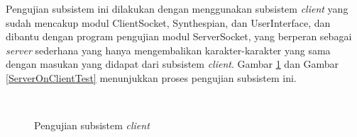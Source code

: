 Pengujian subsistem ini dilakukan dengan menggunakan subsistem \textit{client} yang sudah mencakup modul ClientSocket, Synthespian, dan UserInterface,
dan dibantu dengan program pengujian modul ServerSocket,
yang berperan sebagai \textit{server} sederhana yang hanya mengembalikan karakter-karakter yang sama dengan masukan yang didapat dari subsistem \textit{client}.
Gambar \ref{ClientOnClientTest} dan Gambar \ref{ServerOnClientTest} menunjukkan proses pengujian subsistem ini.

\begin{figure}
\centering
{}
\\
\caption{Pengujian subsistem \textit{client}}
\label{ClientOnClientTest}
\end{figure}

